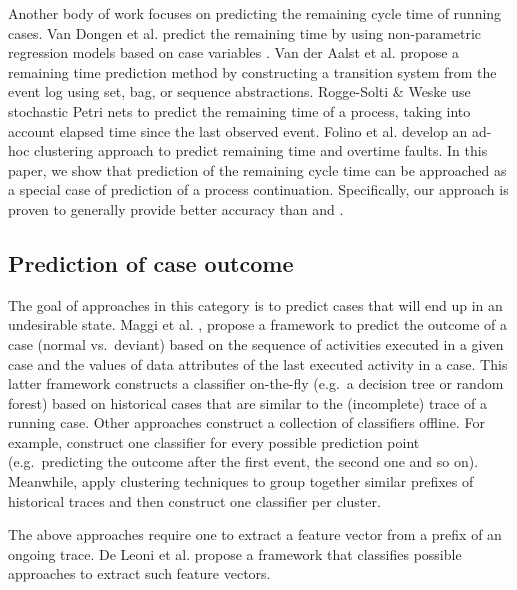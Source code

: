 \documentclass[runningheads,a4paper]{llncs}
\begin{document}
Another body of work focuses on predicting the remaining cycle time of running cases. Van Dongen et al. predict the remaining time by using non-parametric regression models based on case variables \cite{Dongen2008}. Van der Aalst et al. \cite{Aalst2011} propose a remaining time prediction method by constructing a transition system from the event log using set, bag, or sequence abstractions. Rogge-Solti \& Weske \cite{Rogge-Solti2013} use stochastic Petri nets to predict the remaining time of a process, taking into account elapsed time since the last observed event. Folino et al. \cite{Folino2012} develop an ad-hoc clustering approach to predict remaining time and overtime faults. In this paper, we show that prediction of the remaining cycle time can be approached as a special case of prediction of a process continuation. Specifically, our approach is proven to generally provide better accuracy than \cite{Aalst2011} and \cite{Dongen2008}.



\subsection{Prediction of case outcome}

The goal of approaches in this category is to predict cases that will end up in an undesirable state. 
Maggi et al. \cite{Maggi2014}, propose a framework to predict the outcome of a case (normal vs.\ deviant) based on the sequence of activities executed in a given case and the values of data attributes of the last executed activity in a case. This latter framework constructs a classifier on-the-fly (e.g.\ a decision tree or random forest) based on historical cases that are similar to the (incomplete) trace of a running case. Other approaches construct a collection of classifiers offline. For example, \cite{Leontjeva2015} construct one classifier for every possible prediction point (e.g.\ predicting the outcome after the first event, the second one and so on). Meanwhile, \cite{Francescomarino15} apply clustering techniques to group together similar prefixes of historical traces and then construct one classifier per cluster.

The above approaches require one to extract a feature vector from a prefix of an ongoing trace. De Leoni et al. \cite{Leoni2016} propose a framework that classifies possible approaches to extract such feature vectors.
\end{document}
